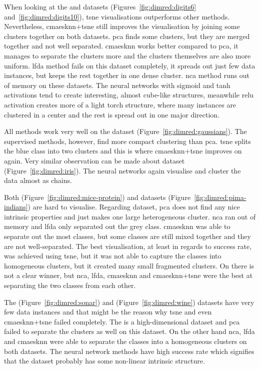 \documentclass[12pt,a4paper]{report}
\begin{document}
When looking at the  and  datasets (Figures~\ref{fig:dimred:digits6} and~\ref{fig:dimred:digits10}), \ac{tsne} visualisations outperforms other methods. Nevertheless, \ac{cmaesknn}+\ac{tsne} still improves the visualisation by joining some clusters together on both datasets. \ac{pca} finds some clusters, but they are merged together and not well separated. \ac{cmaesknn} works better compared to \ac{pca}, it manages to separate the clusters more and the clusters themselves are also more uniform. \ac{lfda} method fails on this dataset completely, it spreads out just few data instances, but keeps the rest together in one dense cluster. \ac{nca} method runs out of memory on these datasets. The neural networks with sigmoid and \ac{tanh} activations tend to create interesting, almost cube-like structures, meanwhile \ac{relu} activation creates more of a light torch structure, where many instances are clustered in a center and the rest is spread out in one major direction.

All methods work very well on the  dataset (Figure~\ref{fig:dimred:gaussians}). The supervised methods, however, find more compact clustering than \ac{pca}. \ac{tsne} splits the blue class into two clusters and this is where \ac{cmaesknn}+\ac{tsne} improves on again. Very similar observation can be made about  dataset (Figure~\ref{fig:dimred:iris}). The neural networks again visualise and cluster the data almost as chains.

Both  (Figure~\ref{fig:dimred:mice-protein}) and  datasets (Figure~\ref{fig:dimred:pima-indians}) are hard to visualise. Regarding  dataset, \ac{pca} does not find any nice intrinsic properties and just makes one large heterogeneous cluster. \ac{nca} ran out of memory and \ac{lfda} only separated out the grey class. \ac{cmaesknn} was able to separate out the most classes, but some classes are still mixed together and they are not well-separated. The best visualisation, at least in regards to success rate, was achieved using \ac{tsne}, but it was not able to capture the classes into homogeneous clusters, but it created many small fragmented clusters. On  there is not a clear winner, but \ac{nca}, \ac{lfda}, \ac{cmaesknn} and \ac{cmaesknn}+\ac{tsne} were the best at separating the two classes from each other.

The  (Figure~\ref{fig:dimred:sonar}) and  (Figure~\ref{fig:dimred:wine}) datasets have very few data instances and that might be the reason why \ac{tsne} and even \ac{cmaesknn}+\ac{tsne} failed completely. The  is a high-dimensional dataset and \ac{pca} failed to separate the clusters as well on this dataset. On the other hand \ac{nca}, \ac{lfda} and \ac{cmaesknn} were able to separate the classes into a homogeneous clusters on both datasets. The neural network methods have high success rate which signifies that the dataset probably has some non-linear intrinsic structure.
\end{document}
